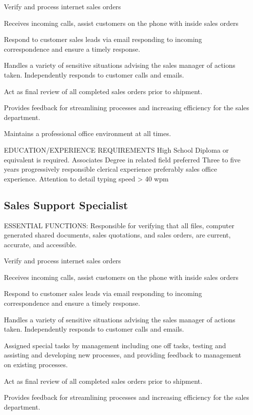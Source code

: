 Verify and process internet sales orders

Receives incoming calls, assist customers on the phone with inside sales orders

Respond to customer sales leads via email responding to incoming correspondence and ensure a timely response.

Handles a variety of sensitive situations advising the sales manager of actions taken.  Independently responds to customer calls and emails.

Act as final review of all completed sales orders prior to shipment.

Provides feedback for streamlining processes and increasing efficiency for the sales department.

Maintains a professional office environment at all times.

EDUCATION/EXPERIENCE REQUIREMENTS
High School Diploma or equivalent is required.  Associates Degree in related field preferred
Three to five years progressively responsible clerical experience preferably sales office experience.
Attention to detail
typing speed > 40 wpm

\subsection{Sales Support Specialist}
ESSENTIAL FUNCTIONS:
Responsible for verifying that all files, computer generated shared documents, sales quotations, and sales orders, are current, accurate, and accessible.

Verify and process internet sales orders

Receives incoming calls, assist customers on the phone with inside sales orders

Respond to customer sales leads via email responding to incoming correspondence and ensure a timely response.

Handles a variety of sensitive situations advising the sales manager of actions taken.  Independently responds to customer calls and emails.

Assigned special tasks by management including one off tasks, testing and assisting and developing new processes, and providing feedback to management on existing processes.

Act as final review of all completed sales orders prior to shipment.

Provides feedback for streamlining processes and increasing efficiency for the sales department.

